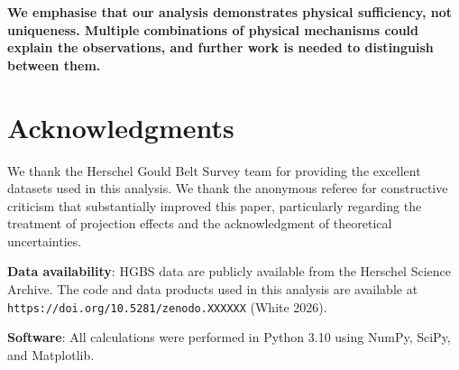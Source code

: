 \documentclass[11pt,a4paper]{article}
\begin{document}
\textbf{We emphasise that our analysis demonstrates physical sufficiency, not uniqueness. Multiple combinations of physical mechanisms could explain the observations, and further work is needed to distinguish between them.}

\section*{Acknowledgments}

We thank the Herschel Gould Belt Survey team for providing the excellent datasets used in this analysis. We thank the anonymous referee for constructive criticism that substantially improved this paper, particularly regarding the treatment of projection effects and the acknowledgment of theoretical uncertainties.

\textbf{Data availability}: HGBS data are publicly available from the Herschel Science Archive. The code and data products used in this analysis are available at \texttt{https://doi.org/10.5281/zenodo.XXXXXX} (White 2026).

\textbf{Software}: All calculations were performed in Python 3.10 using NumPy, SciPy, and Matplotlib.



\end{document}
